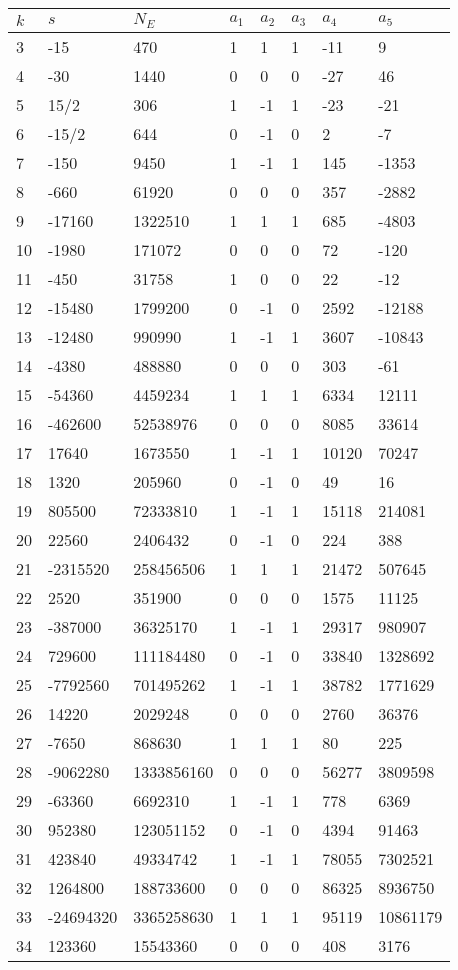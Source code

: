\documentclass{amsart}
\begin{document}
\begin{longtable}{|l|l|l|lllll|}
\hline
$k$ & $s$ & $N_E$ & $a_1$ & $a_2$ & $a_3$ & $a_4$ & $a_5$\\
\hline
3&-15&470&1&1&1&-11&9\\
4&-30&1440&0&0&0&-27&46\\
5&15/2&306&1&-1&1&-23&-21\\
6&-15/2&644&0&-1&0&2&-7\\
7&-150&9450&1&-1&1&145&-1353\\
8&-660&61920&0&0&0&357&-2882\\
9&-17160&1322510&1&1&1&685&-4803\\
10&-1980&171072&0&0&0&72&-120\\
11&-450&31758&1&0&0&22&-12\\
12&-15480&1799200&0&-1&0&2592&-12188\\
13&-12480&990990&1&-1&1&3607&-10843\\
14&-4380&488880&0&0&0&303&-61\\
15&-54360&4459234&1&1&1&6334&12111\\
16&-462600&52538976&0&0&0&8085&33614\\
17&17640&1673550&1&-1&1&10120&70247\\
18&1320&205960&0&-1&0&49&16\\
19&805500&72333810&1&-1&1&15118&214081\\
20&22560&2406432&0&-1&0&224&388\\
21&-2315520&258456506&1&1&1&21472&507645\\
22&2520&351900&0&0&0&1575&11125\\
23&-387000&36325170&1&-1&1&29317&980907\\
24&729600&111184480&0&-1&0&33840&1328692\\
25&-7792560&701495262&1&-1&1&38782&1771629\\
26&14220&2029248&0&0&0&2760&36376\\
27&-7650&868630&1&1&1&80&225\\
28&-9062280&1333856160&0&0&0&56277&3809598\\
29&-63360&6692310&1&-1&1&778&6369\\
30&952380&123051152&0&-1&0&4394&91463\\
31&423840&49334742&1&-1&1&78055&7302521\\
32&1264800&188733600&0&0&0&86325&8936750\\
33&-24694320&3365258630&1&1&1&95119&10861179\\
34&123360&15543360&0&0&0&408&3176\\

\end{longtable}
\end{document}
